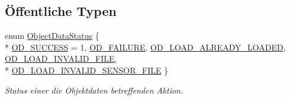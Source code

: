 \subsection*{Öffentliche Typen}
\begin{DoxyCompactItemize}
\item 
enum \hyperlink{classObjectData_a20e8cd3cd0f8af3b571b9393aa9e6484}{Object\-Data\-Status} \{ \\*
\hyperlink{classObjectData_a20e8cd3cd0f8af3b571b9393aa9e6484a85cb5197df82ef2c0657cbe27cd86d3b}{O\-D\-\_\-\-S\-U\-C\-C\-E\-S\-S} = 1, 
\hyperlink{classObjectData_a20e8cd3cd0f8af3b571b9393aa9e6484a755675bc74deb397209031b5197b78cb}{O\-D\-\_\-\-F\-A\-I\-L\-U\-R\-E}, 
\hyperlink{classObjectData_a20e8cd3cd0f8af3b571b9393aa9e6484ac79a877c92087368316c9a758dded970}{O\-D\-\_\-\-L\-O\-A\-D\-\_\-\-A\-L\-R\-E\-A\-D\-Y\-\_\-\-L\-O\-A\-D\-E\-D}, 
\hyperlink{classObjectData_a20e8cd3cd0f8af3b571b9393aa9e6484afd96f2ec6e8243f706fe9ad0b381e24d}{O\-D\-\_\-\-L\-O\-A\-D\-\_\-\-I\-N\-V\-A\-L\-I\-D\-\_\-\-F\-I\-L\-E}, 
\\*
\hyperlink{classObjectData_a20e8cd3cd0f8af3b571b9393aa9e6484aaba8ad9453df4c7a13bd2e43a28e8e0f}{O\-D\-\_\-\-L\-O\-A\-D\-\_\-\-I\-N\-V\-A\-L\-I\-D\-\_\-\-S\-E\-N\-S\-O\-R\-\_\-\-F\-I\-L\-E}
 \}
\begin{DoxyCompactList}\small\item\em Status einer die Objektdaten betreffenden Aktion. \end{DoxyCompactList}\end{DoxyCompactItemize}
